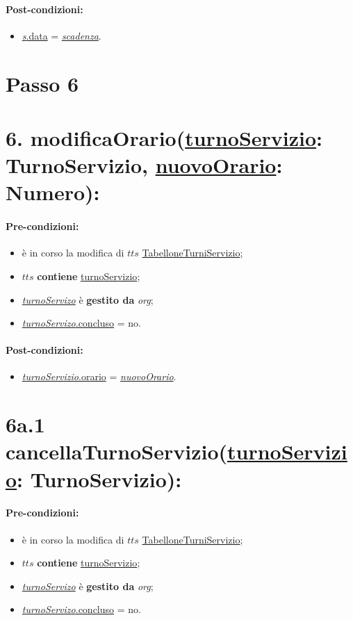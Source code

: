 \paragraph{Post-condizioni:}
\begin{itemize}
    \item \underline{\textit{s}.data} = \underline{\textit{scadenza}}.
\end{itemize}

\section{Passo 6}
\section*{6. modificaOrario(\underline{turnoServizio}: TurnoServizio, \underline{nuovoOrario}: Numero):}

\paragraph{Pre-condizioni:}
\begin{itemize}
 \item è in corso la modifica di $tts$ \underline{TabelloneTurniServizio};
 \item $tts$ \textbf{contiene} \underline{turnoServizio};
   \item \underline{\textit{turnoServizo}} è \textbf{gestito da} {\textit{org}};
   \item \underline{\textit{turnoServizo}.concluso} = no.
\end{itemize}

\paragraph{Post-condizioni:}

\begin{itemize}
    \item \underline{\textit{turnoServizio}.orario} = \underline{\textit{nuovoOrario}}.
\end{itemize}

\section*{6a.1 cancellaTurnoServizio(\underline{turnoServizio}: TurnoServizio):}

\paragraph{Pre-condizioni:}
\begin{itemize}
 \item è in corso la modifica di $tts$ \underline{TabelloneTurniServizio};
 \item $tts$ \textbf{contiene} \underline{turnoServizio};
   \item \underline{\textit{turnoServizo}} è \textbf{gestito da} {\textit{org}};
   \item \underline{\textit{turnoServizo}.concluso} = no.
\end{itemize}

